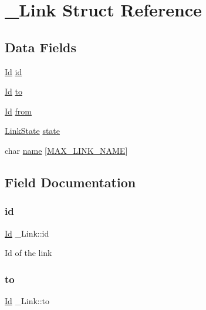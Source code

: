 \hypertarget{struct__Link}{}\section{\+\_\+\+Link Struct Reference}
\label{struct__Link}
\subsection*{Data Fields}
\begin{DoxyCompactItemize}
\item 
\hyperlink{types_8h_a845e604fb28f7e3d97549da3448149d3}{Id} \hyperlink{struct__Link_a151212e7a8e8274c2a1ee991ba95878b}{id}
\item 
\hyperlink{types_8h_a845e604fb28f7e3d97549da3448149d3}{Id} \hyperlink{struct__Link_a54563ccd62fdc5057f55fa8f205d928c}{to}
\item 
\hyperlink{types_8h_a845e604fb28f7e3d97549da3448149d3}{Id} \hyperlink{struct__Link_ae33a61999d11b202a1e1af285aaa84b0}{from}
\item 
\hyperlink{link_8h_ab0033b911037fd995258d117e65461e0}{Link\+State} \hyperlink{struct__Link_a58ecee77b2af4dddadb7e8ff94fa0d15}{state}
\item 
char \hyperlink{struct__Link_aab04e4911b02438ad3e38dc142216935}{name} \mbox{[}\hyperlink{link_8h_ab4477e941817afbf1649fdf3dfb62d70}{M\+A\+X\+\_\+\+L\+I\+N\+K\+\_\+\+N\+A\+ME}\mbox{]}
\end{DoxyCompactItemize}


\subsection{Field Documentation}
\mbox{\label{struct__Link_a151212e7a8e8274c2a1ee991ba95878b}} 
\subsubsection{\texorpdfstring{id}{id}}
{\footnotesize\ttfamily \hyperlink{types_8h_a845e604fb28f7e3d97549da3448149d3}{Id} \+\_\+\+Link\+::id}

Id of the link \mbox{\label{struct__Link_a54563ccd62fdc5057f55fa8f205d928c}} 
\subsubsection{\texorpdfstring{to}{to}}
{\footnotesize\ttfamily \hyperlink{types_8h_a845e604fb28f7e3d97549da3448149d3}{Id} \+\_\+\+Link\+::to}

